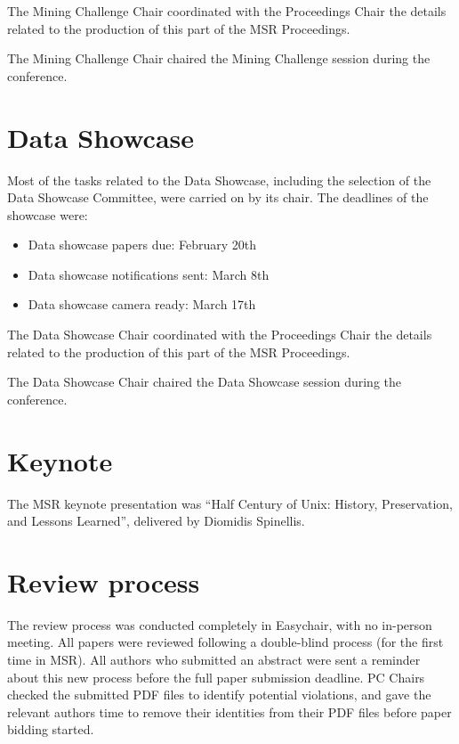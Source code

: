 \documentclass[a4paper]{report}
\begin{document}
The Mining Challenge Chair coordinated with the Proceedings Chair the details related to the production of this part of the MSR Proceedings.

The Mining Challenge Chair chaired the Mining Challenge session during the conference.

\section{Data Showcase}

Most of the tasks related to the Data Showcase, including the selection of the Data Showcase Committee, were carried on by its chair. The deadlines of the showcase were:

\begin{itemize}
\item Data showcase papers due: February 20th
\item Data showcase notifications sent: March 8th
\item Data showcase camera ready: March 17th
\end{itemize}
  
The Data Showcase Chair coordinated with the Proceedings Chair the details related to the production of this part of the MSR Proceedings.

The Data Showcase Chair chaired the Data Showcase session during the conference.

\section{Keynote}

The MSR keynote presentation was ``Half Century of Unix: History, Preservation, and Lessons Learned'', delivered by Diomidis Spinellis.

\section{Review process}

The review process was conducted completely in Easychair, with no in-person meeting. All papers were reviewed following a double-blind process (for the first time in MSR). All authors who submitted an abstract were sent a reminder about this new process before the full paper submission deadline. PC Chairs checked the submitted PDF files to identify potential violations, and gave the relevant authors time to remove their identities from their PDF files before paper bidding started.
\end{document}

